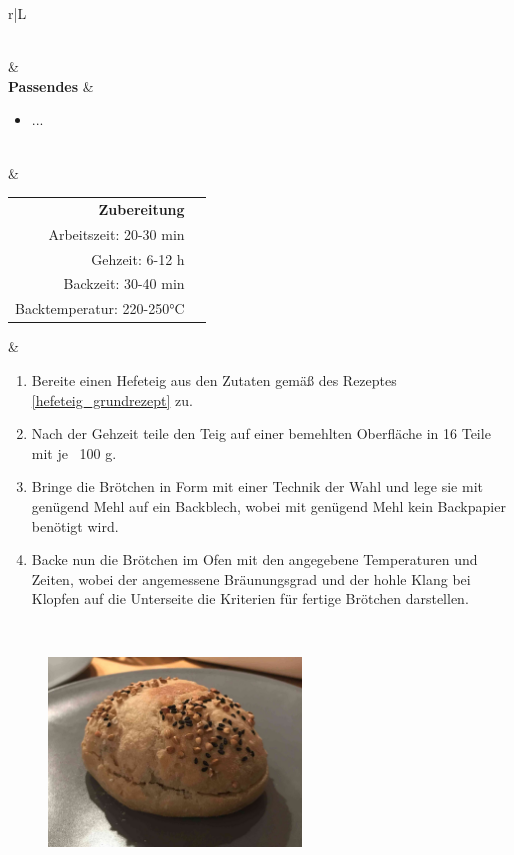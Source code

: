 \documentclass[a4paper, 12pt]{scrbook} 								%
\numberwithin{equation}{section} 									%
\begin{document}
\begin{tabularx}{\textwidth}{r|L}
\begin{itemize}[nosep]
									\end{itemize}	\\
								&	\\	
		\textbf{Passendes}		&	\begin{itemize}[nosep]
										\item ...
									\end{itemize}	\\
								&	\\	
		\begin{tabular}[t]{rr}
			\textbf{Zubereitung}	\\
			Arbeitszeit: 20-30 min	\\
			Gehzeit: 6-12 h			\\
			Backzeit: 30-40 min		\\
			Backtemperatur: 220-250°C \\
		\end{tabular}			&	\begin{enumerate}[nosep]
										\item Bereite einen Hefeteig aus den Zutaten gemäß des Rezeptes \ref{hefeteig_grundrezept} zu.
										\item Nach der Gehzeit teile den Teig auf einer bemehlten Oberfläche in 16 Teile mit je ~100 g.
										\item Bringe die Brötchen in Form mit einer Technik der Wahl und lege sie mit genügend Mehl auf ein Backblech, wobei mit genügend Mehl kein Backpapier benötigt wird.
										\item Backe nun die Brötchen im Ofen mit den angegebene Temperaturen und Zeiten, wobei der angemessene Bräunungsgrad und der hohle Klang bei Klopfen auf die Unterseite die Kriterien für fertige Brötchen darstellen.
									\end{enumerate}	\\
		\end{tabularx}

		\begin{figure}
			\centering
			\includegraphics[width = 0.6\textwidth]{media/burger_broetchen.JPG}
		\end{figure}
\end{document}
